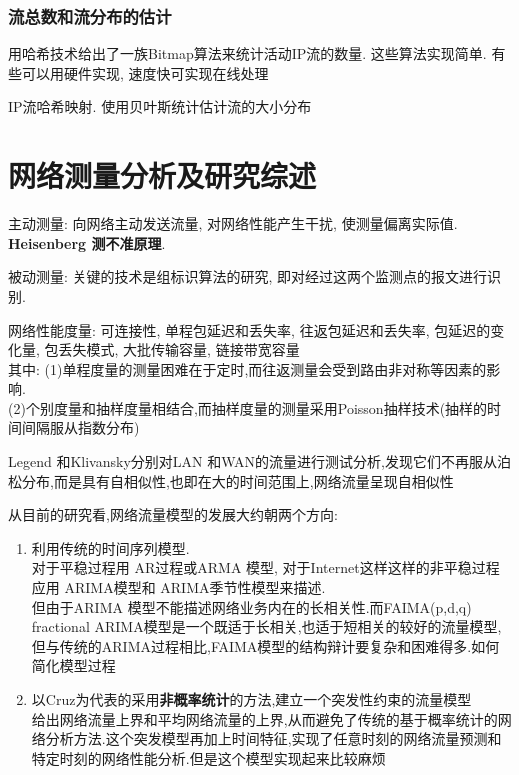 \documentclass{article}
\begin{document}
\subsubsection{流总数和流分布的估计}\label{ux6d41ux603bux6570ux548cux6d41ux5206ux5e03ux7684ux4f30ux8ba1}
用哈希技术给出了一族Bitmap算法来统计活动IP流的数量. 这些算法实现简单.
有些可以用硬件实现, 速度快可实现在线处理

IP流哈希映射. 使用贝叶斯统计估计流的大小分布

\section{网络测量分析及研究综述}\label{ux7f51ux7edcux6d4bux91cfux5206ux6790ux53caux7814ux7a76ux7efcux8ff0}
主动测量: 向网络主动发送流量, 对网络性能产生干扰, 使测量偏离实际值.
\textbf{Heisenberg 测不准原理}.

被动测量: 关键的技术是组标识算法的研究,
即对经过这两个监测点的报文进行识别.

网络性能度量: 可连接性, 单程包延迟和丢失率, 往返包延迟和丢失率,
包延迟的变化量, 包丢失模式, 大批传输容量, 链接带宽容量\\
其中:
(1)单程度量的测量困难在于定时,而往返测量会受到路由非对称等因素的影响.\\
(2)个别度量和抽样度量相结合,而抽样度量的测量采用Poisson抽样技术(抽样的时间间隔服从指数分布)

Legend 和Klivansky分别对LAN 和WAN的流量进行测试分析,发现它们不再服从泊松分布,而是具有自相似性,也即在大的时间范围上,网络流量呈现自相似性

从目前的研究看,网络流量模型的发展大约朝两个方向:
\begin{enumerate}
\item 利用传统的时间序列模型.\\
	对于平稳过程用 AR过程或ARMA 模型, 对于Internet这样这样的非平稳过程应用 ARIMA模型和 ARIMA季节性模型来描述.\\
	但由于ARIMA 模型不能描述网络业务内在的长相关性.而FAIMA(p,d,q) fractional ARIMA模型是一个既适于长相关,也适于短相关的较好的流量模型,但与传统的ARIMA过程相比,FAIMA模型的结构辩计要复杂和困难得多.如何简化模型过程
\item 以Cruz为代表的采用\textbf{非概率统计}的方法,建立一个突发性约束的流量模型\\
	给出网络流量上界和平均网络流量的上界,从而避免了传统的基于概率统计的网络分析方法.这个突发模型再加上时间特征,实现了任意时刻的网络流量预测和特定时刻的网络性能分析.但是这个模型实现起来比较麻烦
\end{enumerate}
\end{document}
